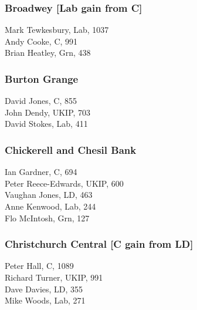 \documentclass[a4paper,openany,10pt]{book}
\begin{document}
\subsubsection*{Broadwey \hspace*{\fill}\nolinebreak[1]%
\enspace\hspace*{\fill}
[Lab gain from C]}



Mark Tewkesbury, Lab, 1037\\
Andy Cooke, C, 991\\
Brian Heatley, Grn, 438\\


\subsubsection*{Burton Grange}



David Jones, C, 855\\
John Dendy, UKIP, 703\\
David Stokes, Lab, 411\\


\subsubsection*{Chickerell and Chesil Bank}



Ian Gardner, C, 694\\
Peter Reece-Edwards, UKIP, 600\\
Vaughan Jones, LD, 463\\
Anne Kenwood, Lab, 244\\
Flo McIntosh, Grn, 127\\


\subsubsection*{Christchurch Central \hspace*{\fill}\nolinebreak[1]%
\enspace\hspace*{\fill}
[C gain from LD]}



Peter Hall, C, 1089\\
Richard Turner, UKIP, 991\\
Dave Davies, LD, 355\\
Mike Woods, Lab, 271\\
\end{document}
